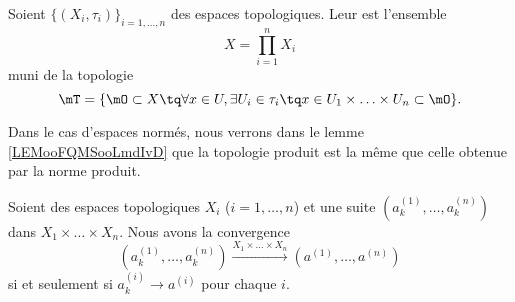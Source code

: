 \begin{definition}      \label{DefIINHooAAjTdY}
	Soient \( \{ (X_i,\tau_i) \}_{i=1,\ldots, n}\) des espaces topologiques. Leur  est l'ensemble
	\begin{equation}
		X=\prod_{i=1}^nX_i
	\end{equation}
	muni de la topologie
	\begin{equation}
		\mT=\{ \mO\subset X\tq \forall x\in U,\exists U_i\in\tau_i\tq x\in U_1\times\ldots\times U_n\subset \mO \}.
	\end{equation}
\end{definition}

Dans le cas d'espaces normés, nous verrons dans le lemme \ref{LEMooFQMSooLmdIvD} que la topologie produit est la même que celle obtenue par la norme produit.

\begin{proposition}
	Soient des espaces topologiques \( X_i\) (\( i=1,\ldots, n\)) et une suite \( (a^{(1)}_k,\ldots, a^{(n)}_k)\) dans \( X_1\times\ldots \times X_n\). Nous avons la convergence
	\begin{equation}
		(a^{(1)}_k,\ldots, a^{(n)}_k)\stackrel{X_1\times\ldots \times X_n}{\longrightarrow}(a^{(1)},\ldots, a^{(n)})
	\end{equation}
	si et seulement si \( a^{(i)}_k\to a^{(i)}\) pour chaque \( i\).
\end{proposition}

